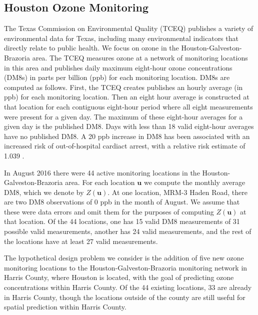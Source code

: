 \documentclass[cmbright]{staauth}
\begin{document}
\subsection{Houston Ozone Monitoring}\label{sec:houston}
The Texas Commission on Environmental Quality (TCEQ) publishes a variety of environmental data for Texas, including many environmental indicators that directly relate to public health. We focus on ozone in the Houston-Galveston-Brazoria area. The TCEQ measures ozone at a network of monitoring locations in this area and publishes daily maximum eight-hour ozone concentrations (DM8s) in parts per billion (ppb) for each monitoring location. DM8s are computed as follows. First, the TCEQ creates publishes an hourly average (in ppb) for each monitoring location. Then an eight hour average is constructed at that location for each contiguous eight-hour period where all eight measurements were present for a given day. The maximum of these eight-hour averages for a given day is the published DM8. Days with less than 18 valid eight-hour averages have no published DM8. A 20 ppb increase in DM8 has been associated with an increased risk of out-of-hospital cardiact arrest, with a relative risk estimate of 1.039 \citep[95\% CI (1.005, 1.073);][]{ensor2013case}.

In August 2016 there were 44 active monitoring locations in the Houston-Galveston-Brazoria area. For each location $\bm{u}$ we compute the monthly average DM8, which we denote by $Z(\bm{u})$. At one location, MRM-3 Haden Road, there are two DM8 observations of 0 ppb in the month of August. We assume that these were data errors and omit them for the purposes of computing $Z(\bm{u})$ at that location. Of the 44 locations, one has 15 valid DM8 measurements of 31 possible valid measurements, another has 24 valid measurements, and the rest of the locations have at least 27 valid measurements.

The hypothetical design problem we consider is the addition of five new ozone monitoring locations to the Houston-Galveston-Brazoria monitoring network in Harris County, where Houston is located, with the goal of predicting ozone concentrations within Harris County. Of the 44 existing locations, 33 are already in Harris County, though the locations outside of the county are still useful for spatial prediction within Harris County.
\end{document}
